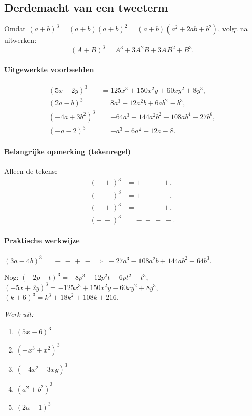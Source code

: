 \documentclass{bis}
\begin{document}
\subsection{Derdemacht van een tweeterm}
Omdat \( (a+b)^3=(a+b)(a+b)^2=(a+b)(a^2+2ab+b^2)\), volgt na uitwerken:
\[
\boxed{(A+B)^3=A^3+3A^2B+3AB^2+B^3}.
\]

\paragraph*{Uitgewerkte voorbeelden}
\[
\begin{aligned}
(5x+2y)^3&=125x^3+150x^2y+60xy^2+8y^3,\\
(2a-b)^3&=8a^3-12a^2b+6ab^2-b^3,\\
({-}4a+3b^2)^3&={-}64a^3+144a^2b^2-108ab^4+27b^6,\\
({-}a-2)^3&={-}a^3-6a^2-12a-8.
\end{aligned}
\]

\paragraph*{Belangrijke opmerking (tekenregel)}
Alleen de tekens:
\[
\begin{aligned}
(+\ +)^3 &= +\ +\ +\ +,\\
(+\ -)^3 &= +\ -\ +\ -,\\
(-\ +)^3 &= -\ +\ -\ +,\\
(-\ -)^3 &= -\ -\ -\ -.
\end{aligned}
\]

\paragraph*{Praktische werkwijze}
\((3a-4b)^3=\;+\,-\,+\,-\;\Rightarrow\; +27a^3-108a^2b+144ab^2-64b^3.\)

Nog:
\(({-}2p-t)^3=-8p^3-12p^2t-6pt^2-t^3\), \quad
\(({-}5x+2y)^3={-}125x^3+150x^2y-60xy^2+8y^3\),\\
\((k+6)^3=k^3+18k^2+108k+216\).

\begin{exercise}
\emph{Werk uit:}
\begin{enumerate}
  \item \((5x-6)^3\)
  \item \(({-}x^3+x^2)^3\)
  \item \(({-}4x^2-3xy)^3\)
  \item \((a^2+b^2)^3\)
  \item \((2a-1)^3\)
\end{enumerate}
\end{exercise}
\end{document}
